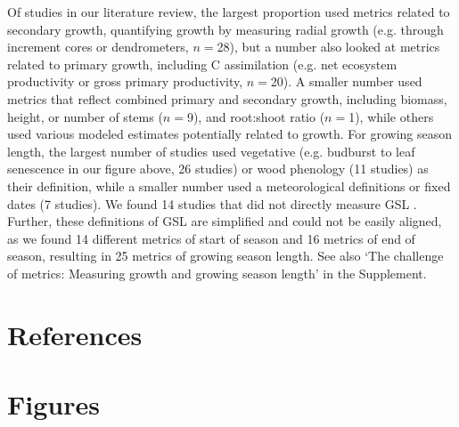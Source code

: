\documentclass[11pt]{article}
\newcommand{\R}[1]{\label{#1}\linelabel{#1}}
\begin{document}
Of studies in our literature review, the largest proportion used metrics related to secondary growth, quantifying growth by measuring radial growth (e.g. through increment cores or dendrometers, $n=$28), but a number also looked at metrics related to primary growth, including C assimilation (e.g. net ecosystem productivity or gross primary productivity, $n=$20). A smaller number used metrics that reflect combined primary and secondary growth, including biomass, height, or number of stems ($n=$9), and root:shoot ratio ($n =$1), while others used various modeled estimates potentially related to growth. For growing season length, the largest number of studies used vegetative (e.g. budburst to leaf senescence in our figure above, 26 studies) or wood phenology (11 studies) as their definition, while a smaller number used a meteorological definitions or fixed dates (7 studies). We found 14 studies that did not directly measure GSL \citep[e.g.][]{zhu2021different,dow2022warm,zohner2023effect}. Further, these definitions of GSL are simplified and could not be easily aligned, as we found 14 different metrics of start of season and 16 metrics of end of season, resulting in  25 metrics of growing season length. See also `The challenge of metrics: Measuring growth and growing season length' in the Supplement.\R{endbox}\\

\clearpage
\section{References}



\clearpage
\section{Figures}
\end{document}
